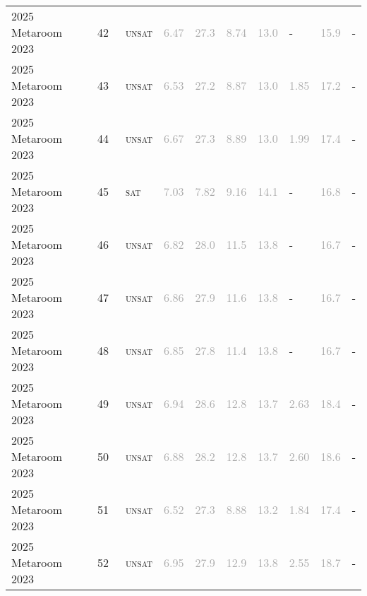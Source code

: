 \begin{center}
{\begin{longtable}{@{}llllllllll@{}}
2025 Metaroom 2023 & 42 & ~\textsc{unsat} & \textcolor{darkgray}{6.47} & \textcolor{darkgray}{27.3} & \textcolor{darkgray}{8.74} & \textcolor{darkgray}{13.0} & - & \textcolor{darkgray}{15.9} & - \\
2025 Metaroom 2023 & 43 & ~\textsc{unsat} & \textcolor{darkgray}{6.53} & \textcolor{darkgray}{27.2} & \textcolor{darkgray}{8.87} & \textcolor{darkgray}{13.0} & \textcolor{darkgray}{1.85} & \textcolor{darkgray}{17.2} & - \\
2025 Metaroom 2023 & 44 & ~\textsc{unsat} & \textcolor{darkgray}{6.67} & \textcolor{darkgray}{27.3} & \textcolor{darkgray}{8.89} & \textcolor{darkgray}{13.0} & \textcolor{darkgray}{1.99} & \textcolor{darkgray}{17.4} & - \\
2025 Metaroom 2023 & 45 & ~\textsc{sat} & \textcolor{darkgray}{7.03} & \textcolor{darkgray}{7.82} & \textcolor{darkgray}{9.16} & \textcolor{darkgray}{14.1} & - & \textcolor{darkgray}{16.8} & - \\
2025 Metaroom 2023 & 46 & ~\textsc{unsat} & \textcolor{darkgray}{6.82} & \textcolor{darkgray}{28.0} & \textcolor{darkgray}{11.5} & \textcolor{darkgray}{13.8} & - & \textcolor{darkgray}{16.7} & - \\
2025 Metaroom 2023 & 47 & ~\textsc{unsat} & \textcolor{darkgray}{6.86} & \textcolor{darkgray}{27.9} & \textcolor{darkgray}{11.6} & \textcolor{darkgray}{13.8} & - & \textcolor{darkgray}{16.7} & - \\
2025 Metaroom 2023 & 48 & ~\textsc{unsat} & \textcolor{darkgray}{6.85} & \textcolor{darkgray}{27.8} & \textcolor{darkgray}{11.4} & \textcolor{darkgray}{13.8} & - & \textcolor{darkgray}{16.7} & - \\
2025 Metaroom 2023 & 49 & ~\textsc{unsat} & \textcolor{darkgray}{6.94} & \textcolor{darkgray}{28.6} & \textcolor{darkgray}{12.8} & \textcolor{darkgray}{13.7} & \textcolor{darkgray}{2.63} & \textcolor{darkgray}{18.4} & - \\
2025 Metaroom 2023 & 50 & ~\textsc{unsat} & \textcolor{darkgray}{6.88} & \textcolor{darkgray}{28.2} & \textcolor{darkgray}{12.8} & \textcolor{darkgray}{13.7} & \textcolor{darkgray}{2.60} & \textcolor{darkgray}{18.6} & - \\
2025 Metaroom 2023 & 51 & ~\textsc{unsat} & \textcolor{darkgray}{6.52} & \textcolor{darkgray}{27.3} & \textcolor{darkgray}{8.88} & \textcolor{darkgray}{13.2} & \textcolor{darkgray}{1.84} & \textcolor{darkgray}{17.4} & - \\
2025 Metaroom 2023 & 52 & ~\textsc{unsat} & \textcolor{darkgray}{6.95} & \textcolor{darkgray}{27.9} & \textcolor{darkgray}{12.9} & \textcolor{darkgray}{13.8} & \textcolor{darkgray}{2.55} & \textcolor{darkgray}{18.7} & - \\

\end{longtable}}
\end{center}
